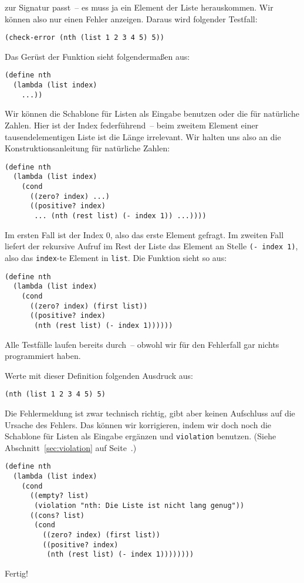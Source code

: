 zur Signatur passt~-- es muss ja ein Element der Liste herauskommen.
Wir können also nur einen Fehler anzeigen.
Daraus wird folgender Testfall:
%
\begin{lstlisting}
(check-error (nth (list 1 2 3 4 5) 5))
\end{lstlisting}
%
Das Gerüst der Funktion sieht folgendermaßen aus:
%
\begin{lstlisting}
(define nth
  (lambda (list index)
    ...))
\end{lstlisting}
%
Wir können die
Schablone für Listen als Eingabe benutzen oder die für natürliche
Zahlen.  Hier ist der Index federführend~-- beim
zweitem Element einer tausendelementigen Liste 
ist die Länge irrelevant.  Wir halten uns also an die
Konstruktionsanleitung für natürliche Zahlen:
%
\begin{lstlisting}
(define nth
  (lambda (list index)
    (cond
      ((zero? index) ...)
      ((positive? index)
       ... (nth (rest list) (- index 1)) ...))))
\end{lstlisting}
%
Im ersten Fall ist der Index $0$, also das erste Element 
gefragt.  Im zweiten Fall liefert der rekursive Aufruf im Rest der
Liste das Element an Stelle \lstinline{(- index 1)}, also
das \lstinline{index}-te Element in \lstinline{list}.  Die
Funktion sieht so aus:
%
\begin{lstlisting}
(define nth
  (lambda (list index)
    (cond
      ((zero? index) (first list))
      ((positive? index)
       (nth (rest list) (- index 1))))))
\end{lstlisting}
%
Alle Testfälle laufen bereits durch~-- obwohl wir
für den Fehlerfall gar nichts programmiert haben.
\begin{aufgabeinline}
  Werte mit dieser Definition folgenden Ausdruck aus:
\begin{lstlisting}
(nth (list 1 2 3 4 5) 5)
\end{lstlisting}
\end{aufgabeinline}
%
Die Fehlermeldung ist zwar technisch richtig, gibt aber keinen
Aufschluss auf die Ursache des Fehlers.  Das können wir korrigieren,
indem wir doch noch die Schablone für Listen als Eingabe ergänzen und
\lstinline{violation} benutzen.  (Siehe Abschnitt~\ref{sec:violation} auf
Seite~\pageref{sec:violation}.)
%
\begin{lstlisting}
(define nth
  (lambda (list index)
    (cond
      ((empty? list)
       (violation "nth: Die Liste ist nicht lang genug"))
      ((cons? list)
       (cond
         ((zero? index) (first list))
         ((positive? index)
          (nth (rest list) (- index 1))))))))
\end{lstlisting}
%
Fertig!

